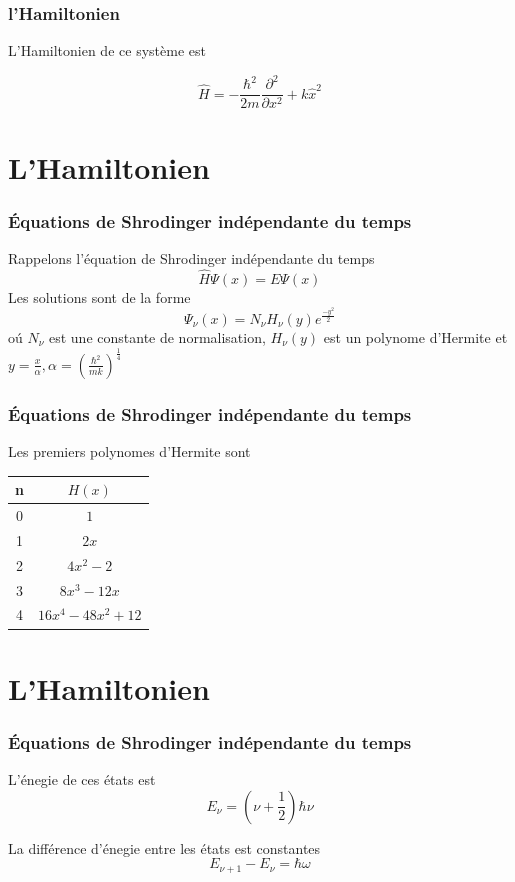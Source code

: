 \documentclass[aspectratio=169]{beamer}
\begin{document}
\begin{frame}
\frametitle{l'Hamiltonien}

L'Hamiltonien de ce système est

\begin{equation}\tag{2}
\hat{H}=-\frac{\hbar^2}{2m}\frac{\partial^2}{\partial x^2}+k\hat{x}^2
\end{equation} 



\end{frame}

\section{L'Hamiltonien}
\begin{frame}
\frametitle{Équations de Shrodinger indépendante du temps}
Rappelons l'équation de Shrodinger indépendante du temps
\begin{equation}
\hat{H}\Psi(x)=E\Psi(x)
\end{equation}
Les solutions sont de la forme
\begin{equation}
\Psi_{\nu}(x)=N_{\nu}H_{\nu}(y)e^{\frac{-y^2}{2}}
\end{equation}
o\'u $N_{\nu}$ est une constante de normalisation, $H_{\nu}(y)$ est un polynome d'Hermite et $y=\frac{x}{\alpha}, \alpha=(\frac{\hbar^2}{mk})^{\frac{1}{4}}$

\end{frame}

\begin{frame}
\frametitle{Équations de Shrodinger indépendante du temps}
Les premiers polynomes d'Hermite sont 
\begin{table}
\begin{tabular}{ c | c }
n & $H(x)$ \\\hline
0 & $1$  \\
1 & $2x$ \\
2 & $4x^2-2$ \\
3 & $8x^3-12x$ \\
4 & $16x^4-48x^2+12$  \\
\end{tabular} 
\end{table}

\end{frame}

%
\section{L'Hamiltonien}
\begin{frame}
\frametitle{Équations de Shrodinger indépendante du temps}
L'énegie de ces états est
\begin{equation}
E_{\nu}=\left(\nu+\frac{1}{2}\right)\hbar\nu
\end{equation}

La différence d'énegie entre les états est constantes
\begin{equation}
E_{\nu+1}-E_{\nu}=\hbar \omega
\end{equation}
\end{frame}
\end{document}
